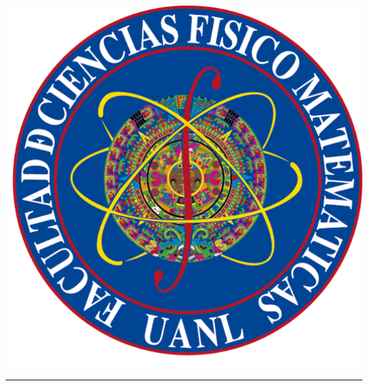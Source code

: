 \documentclass{article}
\begin{document}
\begin{minipage}{0.2\linewidth}
\hspace*{1.2cm}
\includegraphics[scale=0.30]{images/fcfm.png}
\end{minipage}
\vspace*{1cm}
\textcolor{rb}{\hrule}
\end{document}

